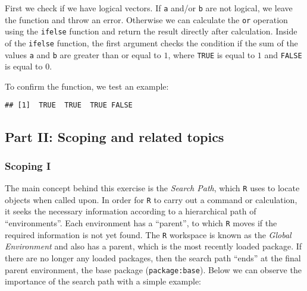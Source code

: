 \documentclass[11,]{article}
\newenvironment{Shaded}{\begin{snugshade}}{\end{snugshade}}
\newcommand{\KeywordTok}[1]{\textcolor[rgb]{0.13,0.29,0.53}{\textbf{{#1}}}}
\newcommand{\StringTok}[1]{\textcolor[rgb]{0.31,0.60,0.02}{{#1}}}
\newcommand{\OtherTok}[1]{\textcolor[rgb]{0.56,0.35,0.01}{{#1}}}
\newcommand{\NormalTok}[1]{{#1}}
\begin{document}
First we check if we have logical vectors. If \texttt{a} and/or
\texttt{b} are not logical, we leave the function and throw an error.
Otherwise we can calculate the \texttt{or} operation using the
\texttt{ifelse} function and return the result directly after
calculation. Inside of the \texttt{ifelse} function, the first argument
checks the condition if the sum of the values \texttt{a} and \texttt{b}
are greater than or equal to \(1\), where \texttt{TRUE} is equal to
\(1\) and \texttt{FALSE} is equal to \(0\).

To confirm the function, we test an example:

\begin{Shaded}
\end{Shaded}

\begin{verbatim}
## [1]  TRUE  TRUE  TRUE FALSE
\end{verbatim}

\subsection{Part II: Scoping and related
topics}\label{part-ii-scoping-and-related-topics}

\subsubsection{Scoping I}\label{scoping-i}

The main concept behind this exercise is the \emph{Search Path}, which
\texttt{R} uses to locate objects when called upon. In order for
\texttt{R} to carry out a command or calculation, it seeks the necessary
information according to a hierarchical path of ``environments''. Each
environment has a ``parent'', to which \texttt{R} moves if the required
information is not yet found. The \texttt{R} workspace is known as the
\emph{Global Environment} and also has a parent, which is the most
recently loaded package. If there are no longer any loaded packages,
then the search path ``ends'' at the final parent environment, the base
package (\texttt{package:base}). Below we can observe the importance of
the search path with a simple example:
\end{document}
